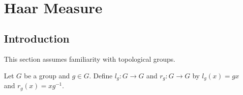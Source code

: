 \documentclass{book}
\begin{document}



~\cite{simmons2012conditional}





































































	\newpage
	\chapter{Haar Measure}
	
	\section{Introduction}
	
	\begin{note}
	This section assumes familiarity with topological groups. 
	\end{note}

	\begin{defn}  
		Let $G$ be a group and $g \in G$. Define $l_g:G \rightarrow G$ and $r_g:G \rightarrow G$ by $l_g(x) = gx$ and $r_g(x) = xg^{-1}$. 
	\end{defn}
\end{document}
